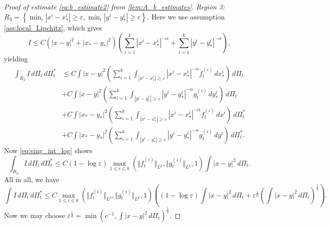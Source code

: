 \documentclass[10pt,oneside]{amsart}
\numberwithin{equation}{section}
\numberwithin{definition}{section}
\numberwithin{theorem}{section}
\numberwithin{lemma}{section}
\begin{document}
\begin{proof}[Proof of estimate \cref{eq:b_estimate2} from \cref{lem:A_b_estimates}]
  \textit{Region 3: $R_{3}=\left\{ \min_{i}|x^{i}-x_{*}^{i}|\geq\varepsilon,\min_{i}|y^{i}-y_{*}^{i}|\geq\varepsilon\right\}$.} Here we use assumption \ref{ass:local_Lipchitz}, which gives
  \begin{equation*}
    I\leq C\left(|x-y|^{2}+|x_{*}-y_{*}|^{2}\right)\left(\sum_{i=1}^{k}|x^{i}-x_{*}^{i}|^{-\alpha}+\sum_{i=1}^{k}|y^{i}-y_{*}^{i}|^{-\alpha}\right),
  \end{equation*}
  yielding
  \begin{align*}
    \int_{R_{3}}I\,d\Pi_{t}\,d\Pi_{t}^{*}&
    \leq C\int|x-y|^{2}\left(\sum_{i=1}^{k}\int_{|x^{i}-x_{*}^{i}|\geq\varepsilon}|x^{i}-x_{*}^{i}|^{-\alpha}f_{t}^{(i)}\,dx_{*}^{i}\right)\,d\Pi_{t}\\
    &+C\int|x-y|^{2}\left(\sum_{i=1}^{k}\int_{|y^{i}-y_{*}^{i}|\geq\varepsilon}|y^{i}-y_{*}^{i}|^{-\alpha}g_{t}^{(i)}\,dy_{*}^{i}\right)\,d\Pi_{t}\\
    &+C\int|x_{*}-y_{*}|^{2}\left(\sum_{i=1}^{k}\int_{|x^{i}-x_{*}^{i}|\geq\varepsilon}|x^{i}-x_{*}^{i}|^{-\alpha}f_{t}^{(i)}\,dx^{i}\right)\,d\Pi_{t}^{*}\\
    &+C\int|x_{*}-y_{*}|^{2}\left(\sum_{i=1}^{k}\int_{|y^{i}-y_{*}^{i}|\geq\varepsilon}|y^{i}-y_{*}^{i}|^{-\alpha}g_{t}^{(i)}\,dy^{i}\right)\,d\Pi_{t}^{*}.
  \end{align*}
  Now \cref{eq:sing_int_log} shows
  \begin{equation*}
    \int_{R_{3}}I\,d\Pi_{t}\,d\Pi_{t}^{*}\leq 
    C(1-\log\varepsilon)\max_{1\leq i \leq k}(\Vert f_{t}^{(i)}\Vert _{L^{p}},\Vert g_{t}^{(i)}\Vert _{L^{p}},1)\int|x-y|^{2}\,d\Pi_{t}.
  \end{equation*}
  All in all, we have
  \begin{equation*}
    \int I\,d\Pi_{t}\,d\Pi_{t}^{*}\leq 
    C\max_{1\leq i \leq k}(\Vert f_{t}^{(i)}\Vert _{L^{p}},\Vert g_{t}^{(i)}\Vert _{L^{p}},1)\left((1-\log\varepsilon)\int|x-y|^{2}\,d\Pi_{t}+\varepsilon^{\frac{1}{d}}\left(\int|x-y|^2\,d\Pi_t\right)^\frac{1}{2}\right).
  \end{equation*}
  Now we may choose $\displaystyle\varepsilon^\frac{1}{d} = \min \left(e^{-1},\int|x-y|^{2}\,d\Pi_{t}\right)^{\frac{1}{2}}$.
\end{proof}


\end{document}
